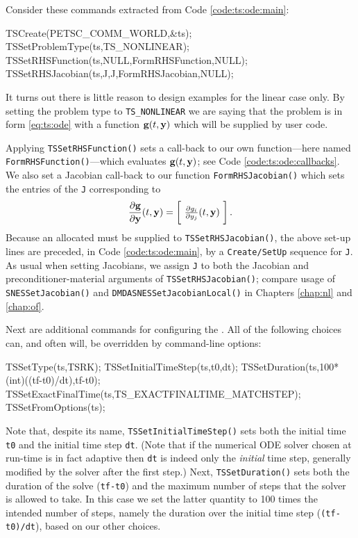 
Consider these commands extracted from Code \ref{code:ts:ode:main}:
\begin{code}
  TSCreate(PETSC_COMM_WORLD,&ts);
  TSSetProblemType(ts,TS_NONLINEAR);
  TSSetRHSFunction(ts,NULL,FormRHSFunction,NULL);
  TSSetRHSJacobian(ts,J,J,FormRHSJacobian,NULL);
\end{code}
It turns out there is little reason to design \PETSc examples for the linear case only.  By setting the problem type to \texttt{TS\_NONLINEAR} we are saying that the problem is in form \eqref{eq:ts:ode} with a function $\mathbf{g}(t,\mathbf{y})$ which will be supplied by user code.

Applying \texttt{TSSetRHSFunction()} sets a call-back to our own function---here named \texttt{FormRHSFunction()}---which evaluates $\mathbf{g}(t,\mathbf{y})$; see Code \ref{code:ts:ode:callbacks}.  We also set a Jacobian call-back to our function \texttt{FormRHSJacobian()} which sets the entries of the \pMat \texttt{J} corresponding to
    $$\frac{\partial \mathbf{g}}{\partial \mathbf{y}}(t,\mathbf{y}) = \begin{bmatrix}\phantom{\bigg|} \frac{\partial g_i}{\partial y_j}(t,\mathbf{y}) \phantom{\bigg|}\end{bmatrix}.$$
Because an allocated \pMat must be supplied to \texttt{TSSetRHSJacobian()}, the above \pTS set-up lines are preceded, in Code \ref{code:ts:ode:main}, by a \texttt{Create/SetUp} sequence for \pMat \texttt{J}.  As usual when setting Jacobians, we assign \texttt{J} to both the Jacobian and preconditioner-material arguments of \texttt{TSSetRHSJacobian()}; compare usage of \texttt{SNESSetJacobian()} and \texttt{DMDASNESSetJacobianLocal()} in Chapters \ref{chap:nl} and \ref{chap:of}.

Next are additional commands for configuring the \pTS.  All of the following choices can, and often will, be overridden by command-line options:
\begin{code}
  TSSetType(ts,TSRK);
  TSSetInitialTimeStep(ts,t0,dt);
  TSSetDuration(ts,100*(int)((tf-t0)/dt),tf-t0);
  TSSetExactFinalTime(ts,TS_EXACTFINALTIME_MATCHSTEP);
  TSSetFromOptions(ts);
\end{code}
Note that, despite its name, \texttt{TSSetInitialTimeStep()} sets both the initial time \texttt{t0} and the initial time step \texttt{dt}.  (Note that if the numerical ODE solver chosen at run-time is in fact adaptive then \texttt{dt} is indeed only the \emph{initial} time step, generally modified by the solver after the first step.)  Next, \texttt{TSSetDuration()} sets both the duration of the solve (\texttt{tf-t0}) and the maximum number of steps that the solver is allowed to take.  In this case we set the latter quantity to 100 times the intended number of steps, namely the duration over the initial time step (\texttt{(tf-t0)/dt}), based on our other choices.


